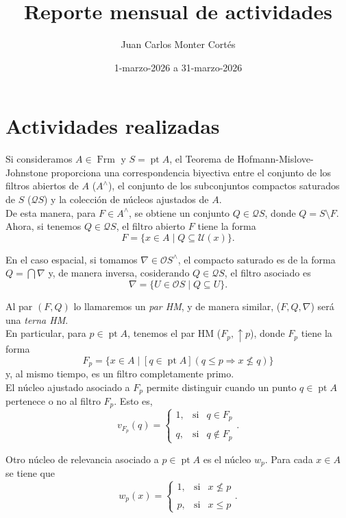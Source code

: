 \documentclass[12pt]{article}
\title{Reporte mensual de actividades}
\date{1-marzo-2026 a 31-marzo-2026}
\author{Juan Carlos Monter Cortés}
\DeclareMathOperator{\Frm}{Frm}
\DeclareMathOperator{\pt}{pt}
\begin{document}
\maketitle

\section{Actividades realizadas}
Si consideramos $A\in \Frm$ y $S=\pt A$, el Teorema de Hofmann-Mislove-Johnstone proporciona una correspondencia biyectiva entre
el conjunto de los filtros abiertos de $A$ ($A^\wedge$), el conjunto de los subconjuntos compactos saturados de $S$ ($\mathcal{Q}S$) y 
la colección de núcleos ajustados de $A$.\\

De esta manera, para $F\in A^\wedge$, se obtiene un conjunto $Q\in \mathcal{Q}S$, donde $Q=S\setminus F$. Ahora, si tenemos $Q\in \mathcal{Q}S$, el filtro abierto $F$ tiene la forma
\[
F=\{x\in A\mid Q\subseteq \mathcal{U}(x)\}.
\]

En el caso espacial, si tomamos $\nabla\in \mathcal{O}S^\wedge$, el compacto saturado es de la forma $Q=\bigcap \nabla$ y, de manera inversa, cosiderando $Q\in \mathcal{Q}S$, el filtro asociado es
\[
\nabla=\{U\in \mathcal{O}S\mid Q\subseteq U\}.
\]
 
Al par $(F, Q)$ lo llamaremos un \emph{par HM}, y de manera similar, ($F, Q, \nabla$) será una \emph{terna HM}.\\

En particular, para $p\in \pt A$, tenemos el par HM ($F_p, \uparrow p$), donde $F_p$ tiene la forma
\begin{equation}\label{filtro-p}
F_p=\{x\in A\mid [q\in \pt A](q\leq p\Rightarrow x\nleq q)\}
\end{equation}
y, al mismo tiempo, es un filtro completamente primo.\\
 
El núcleo ajustado asociado a $F_p$ permite distinguir cuando un punto $q\in \pt A$ pertenece o no al filtro $F_p$. Esto es,
\begin{equation}\label{nucleo-ajustado-p}
v_{F_p}(q)=  \left\{ \begin{array}{lcc} 1, & \text{si}  &  q\in F_p\\ \\ q, & \text{si} & q\not\in F_p \end{array} \right..
\end{equation}

Otro núcleo de relevancia asociado a $p\in \pt A$ es el núcleo $w_p$. Para cada $x\in A$ se tiene que 
\begin{equation}\label{nucleo-wp}
w_p(x)=\left\{ \begin{array}{lcc} 1, & \text{si}  &  x\nleq p\\ \\ p, & \text{si} & x\leq p 
\end{array} \right..
\end{equation}
\end{document}
